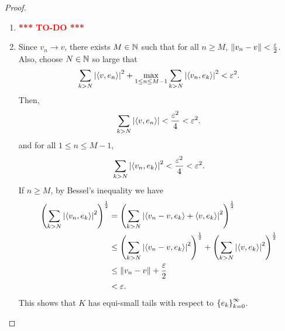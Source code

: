 \documentclass[a4paper]{article}
\newcommand{\TODO}{\textcolor{red}{\textbf{*** TO-DO ***}}}
\begin{document}
\begin{proof}
\begin{enumerate}
  \item \TODO 
  
  \item Since $v_n \to v$, there exists 
  $M \in \mathbb{N}$ such that for all $n \geq M$, 
  $\left\lVert v_n - v\right\rVert < \frac{\varepsilon}{2}$. Also, choose 
  $N \in \mathbb{N}$ so large that 
  \[
  \sum_{k > N} \left\lvert \left\langle v, e_n \right\rangle\right\rvert^2 
  + \max_{1 \leq n \leq M - 1} \sum_{k > N} 
  \left\lvert \left\langle v_n, e_k \right\rangle\right\rvert^2 < \varepsilon^2.
  \]
  Then, 
  \[
  \sum_{k > N} \left\lvert \left\langle v, e_n \right\rangle\right\rvert < \frac{\varepsilon^2}{4}
  < \varepsilon^2.
  \]
  and for all $1 \leq n \leq M - 1$, 
  \[
  \sum_{k > N} \left\lvert \left\langle v_n, e_k \right\rangle\right\rvert^2 < \frac{\varepsilon^2}{4} 
  < \varepsilon^2.
  \]
  If $n \geq M$, by Bessel's inequality we have 
  \[
  \begin{aligned}
    \left( \sum_{k > N} \left\lvert \left\langle v_n, e_k \right\rangle\right\rvert^2 \right)^{\frac{1}{2}}
    & = \left( \sum_{k > N} \left\lvert \left\langle v_n - v, e_k \right\rangle + \left\langle v, e_k \right\rangle\right\rvert^2 
    \right)^{\frac{1}{2}} \\
    & \leq 
    \left( \sum_{k > N} \left\lvert \left\langle v_n - v, e_k \right\rangle\right\rvert^2 \right)^{\frac{1}{2}} 
    + \left( \sum_{k > N} \left\lvert \left\langle v, e_k \right\rangle\right\rvert^2  \right)^{\frac{1}{2}} \\ 
    & \leq \left\lVert v_n - v\right\rVert + \frac{\varepsilon}{2} \\
    &< \varepsilon.
  \end{aligned}
  \]
  This shows that $K$ has equi-small tails with respect 
  to $\left\{ e_k \right\}_{k=0}^\infty$.
\end{enumerate}
\end{proof}
\end{document}
